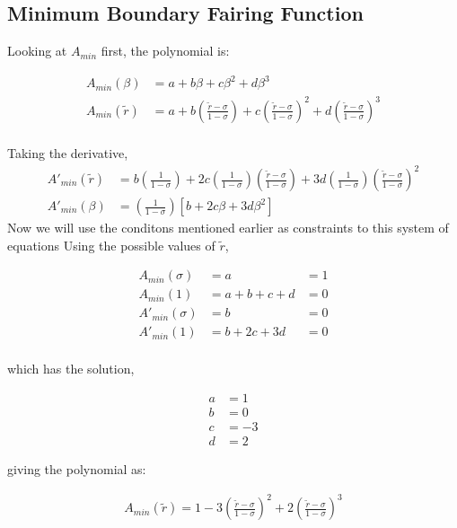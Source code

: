 \subsection{Minimum Boundary Fairing Function}

Looking at $A_{min}$ first, the polynomial is:

\begin{align*}
    A_{min} \left( \beta \right) &= 
    a + b \beta + c \beta^2 + d \beta^3                   \\
    A_{min} \left( \widetilde{r} \right) &= 
    a + b \left( \frac{\widetilde{r} - \sigma}{1 - \sigma} \right)+
    c\left( \frac{\widetilde{r} - \sigma}{1 - \sigma} \right)  ^2+
    d\left( \frac{\widetilde{r} - \sigma}{1 - \sigma} \right)^3                    \\
\end{align*}

Taking the derivative,
\begin{align*}
    A'_{min} \left( \widetilde{r} \right) &= 
    b \left( \frac{1}{1 - \sigma} \right)+
    2 c\left( \frac{1}{1 - \sigma} \right)\left( \frac{\widetilde{r} - \sigma}{1 - \sigma} \right)  +
    3 d\left( \frac{1}{1-\sigma} \right)\left( \frac{\widetilde{r} - \sigma}{1 - \sigma} \right)^2\\
    A'_{min} \left( \beta \right) &= 
    \left( \frac{1}{1 - \sigma} \right)
    \left[
    b +
    2 c \beta + 
    3 d \beta^2
    \right]
\end{align*}
Now we will use the conditons mentioned earlier as constraints to this system 
of equations
Using the possible values of $\widetilde{r}$,

\begin{align*}
    A_{min}(\sigma) &= a &= 1 \\
    A_{min}(1) &= a + b + c + d  &= 0 \\
    A'_{min}(\sigma) &=  b    &= 0 \\
    A'_{min}(1) &=  b + 2 c + 3 d    &= 0 \\
\end{align*}


which has the solution,

\begin{align*}
    a &= 1 \\
    b &= 0 \\
    c &= -3 \\
    d &= 2 
\end{align*}

giving the polynomial as: 

\begin{align*}
    A_{min} (\widetilde{r}) = 1 - 3 \left(  \frac{\widetilde{r} - \sigma }{ 1 - \sigma}\right)^2 +
    2 \left( \frac{\widetilde{r} - \sigma}{1 - \sigma} \right)^3 
\end{align*}

